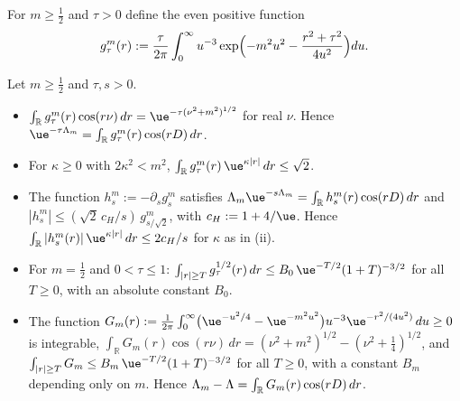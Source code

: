 For $m\ge\tfrac12$ and $\tau>0$ define the even positive function
\[
g^m_\tau(r):=\frac{\tau}{2\pi}\int_0^\infty u^{-3}\exp\Bigl(-m^2u^2-\frac{r^2+\tau^2}{4u^2}\Bigr)du .
\]

\begin{lemma}[profiles]\label{os:prof}
Let $m\ge\tfrac12$ and $\tau,s>0$.
\begin{itemize}
\item[(i)] $\int_{\mathbb R}g^m_\tau(r)\cos(r\nu)\,dr=\ue^{-\tau(\nu^2+m^2)^{1/2}}$ for real $\nu$. Hence $\ue^{-\tau\Lambda_m}=\int_{\mathbb R}g^m_\tau(r)\cos(rD)\,dr$.
\item[(ii)] For $\kappa\ge0$ with $2\kappa^2<m^2$, $\int_{\mathbb R}g^m_\tau(r)\,\ue^{\kappa|r|}\,dr\le\sqrt2$.
\item[(iii)] The function $h^m_s:=-\partial_sg^m_s$ satisfies $\Lambda_m\ue^{-s\Lambda_m}=\int_{\mathbb R}h^m_s(r)\cos(rD)\,dr$ and
$|h^m_s|\le(\sqrt2\,c_H/s)\,g^m_{s/\sqrt2}$, with $c_H:=1+4/\ue$. Hence $\int_{\mathbb R}|h^m_s(r)|\,\ue^{\kappa|r|}\,dr\le2c_H/s$ for $\kappa$ as
in (ii).
\item[(iv)] For $m=\tfrac12$ and $0<\tau\le1$: $\int_{|r|\ge T}g^{1/2}_\tau(r)\,dr\le B_0\,\ue^{-T/2}(1+T)^{-3/2}$ for all $T\ge0$, with
an absolute constant $B_0$.
\item[(v)] The function $G_m(r):=\frac1{2\pi}\int_0^\infty\bigl(\ue^{-u^2/4}-\ue^{-m^2u^2}\bigr)u^{-3}\ue^{-r^2/(4u^2)}\,du\ge0$ is integrable,
$\int_{\mathbb R}G_m(r)\cos(r\nu)\,dr=(\nu^2+m^2)^{1/2}-(\nu^2+\tfrac14)^{1/2}$, and
$\int_{|r|\ge T}G_m\le B_m\,\ue^{-T/2}(1+T)^{-3/2}$ for all $T\ge0$, with a constant $B_m$ depending only on $m$.
Hence $\Lambda_m-\Lambda=\int_{\mathbb R}G_m(r)\cos(rD)\,dr$.
\end{itemize}
\end{lemma}
